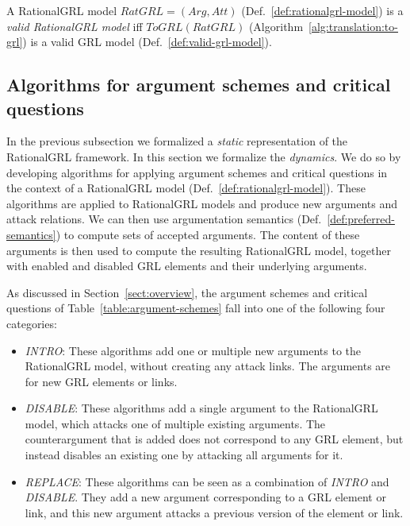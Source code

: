 \begin{definition}
\label{def:valid-rationalgrl-model}
A RationalGRL model $RatGRL = (Arg, Att)$ (Def.~\ref{def:rationalgrl-model})
is a \emph{valid RationalGRL model} iff $ToGRL(RatGRL)$ (Algorithm~\ref{alg:translation:to-grl}) is a valid GRL model (Def.~\ref{def:valid-grl-model}).
\end{definition}

\subsection{Algorithms for argument schemes and critical questions}
\label{sect:algorithms}

In the previous subsection we formalized a \emph{static} representation of the RationalGRL framework. In this section we formalize the \emph{dynamics}. We do so by developing algorithms for applying argument schemes and critical questions in the context of a RationalGRL model (Def.~\ref{def:rationalgrl-model}). These algorithms are applied to RationalGRL models and produce new arguments and attack relations. We can then use argumentation semantics (Def.~\ref{def:preferred-semantics}) to compute sets of accepted arguments. The content of these arguments is then used to compute the resulting RationalGRL model, together with enabled and disabled GRL elements and their underlying arguments.

As discussed in Section~\ref{sect:overview}, the argument schemes and critical questions of Table~\ref{table:argument-schemes} fall into one of the following four categories:
\begin{itemize}
\item \emph{INTRO}: These algorithms add one or multiple new arguments to the RationalGRL model, without creating any attack links. The arguments are for new GRL elements or links.
\item \emph{DISABLE}: These algorithms add a single argument to the RationalGRL model, which attacks one of multiple existing arguments. The counterargument that is added does not correspond to any GRL element, but instead disables an existing one by attacking all arguments for it.
\item \emph{REPLACE}: These algorithms can be seen as a combination of \emph{INTRO} and \emph{DISABLE}. They add a new argument corresponding to a GRL element or link, and this new argument attacks a previous version of the element or link. 
\end{itemize}

